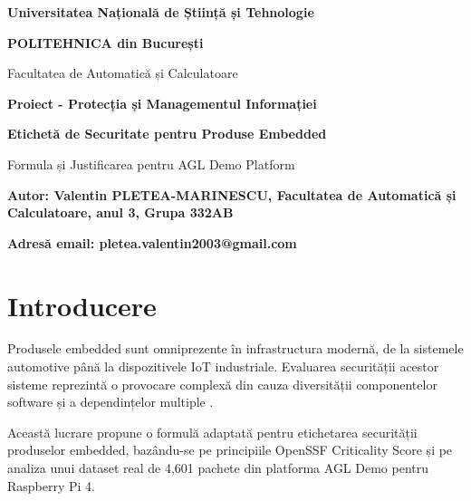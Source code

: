\documentclass[12pt,a4paper]{article}
\begin{document}
\begin{titlepage}
    \centering
    \vspace{1cm}
    
    {\Large\bfseries\centering Universitatea Națională de Știință și Tehnologie}
    
    {\large\bfseries\centering POLITEHNICA din București}
    
    {\large\centering Facultatea de Automatică și Calculatoare}
        
    \vspace{3cm}
    
    {\Large\bfseries\centering Proiect - Protecția și Managementul Informației}

    \vspace{2cm}
    
    {\LARGE\bfseries\centering Etichetă de Securitate pentru Produse Embedded\\[1cm]}
    
    {\large\centering Formula și Justificarea pentru AGL Demo Platform}

    \vspace{\fill}
    
    \raggedright
    {\large\bfseries Autor: Valentin PLETEA-MARINESCU, Facultatea de Automatică și
    Calculatoare, anul 3, Grupa 332AB \par}
    {\large\bfseries Adresă email: pletea.valentin2003@gmail.com \par}
    
    \vspace{1cm}
    
\end{titlepage}

\hypersetup{
    colorlinks=false,
    linkcolor=black,
    filecolor=black,      
    urlcolor=black,
    hidelinks
}
\tableofcontents
\newpage

\section{Introducere}

Produsele embedded sunt omniprezente în infrastructura modernă, de la sistemele automotive până la dispozitivele IoT industriale. Evaluarea securității acestor sisteme reprezintă o provocare complexă din cauza diversității componentelor software și a dependințelor multiple \cite{nguyen2020security,cui2013embedded}.

Această lucrare propune o formulă adaptată pentru etichetarea securității produselor embedded, bazându-se pe principiile OpenSSF Criticality Score \cite{openssf2021criticality} și pe analiza unui dataset real de 4,601 pachete din platforma AGL Demo pentru Raspberry Pi 4.
\end{document}
